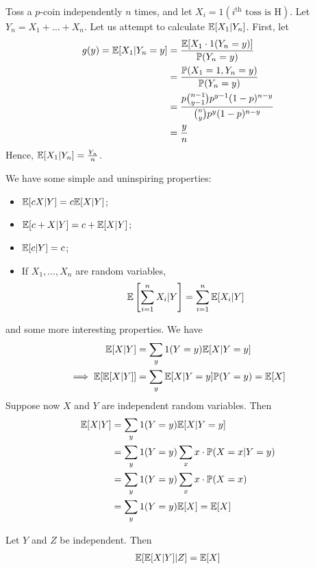 \documentclass{../template/note}
\begin{document}
    \begin{example*}
        Toss a \(p\)-coin independently \(n\) times, and let \(X_i = 1(i^\text{th} \text{ toss is H})\). Let \(Y_n = X_1 + \dots + X_n\). Let us attempt to calculate \(\mathbb E[X_1 | Y_n]\). First, let
        \begin{align*}
            g(y) = \mathbb E[X_1 | Y_n = y] &= \frac{\mathbb E[X_1 \cdot 1(Y_n=y)]}{\mathbb P(Y_n=y)} \\
            &= \frac{\mathbb P(X_1 = 1, Y_n = y)}{\mathbb P(Y_n=y)} \\
            &= \frac{p \binom{n-1}{y-1} p^{y-1} (1-p)^{n-y}}{\binom{n}{y} p^y (1-p)^{n-y}} \\
            &= \frac{y}{n}
        \end{align*}
        Hence, \(\mathbb E[X_1 | Y_n] = \frac{Y_n}{n}\).        
    \end{example*}
    We have some simple and uninspiring properties:
    \begin{itemize}
        \item \(\mathbb E[cX | Y] = c\mathbb E[X | Y]\);
        \item \(\mathbb E[c + X | Y] = c + \mathbb E[X | Y]\);
        \item \(\mathbb E[c | Y] = c\);
        \item If \(X_1, \dots, X_n\) are random variables,
        \begin{align*}
            \mathbb E\left[\sum_{i=1}^n X_i | Y\right] = \sum_{i=1}^n \mathbb E[X_i | Y]
        \end{align*}
    \end{itemize}
    and some more interesting properties. We have
    \begin{align*}
        \mathbb E[X | Y] &= \sum_y 1(Y = y) \mathbb E[X | Y = y] \\
        \implies \mathbb E[\mathbb E[X | Y]] &= \sum_y \mathbb E[X | Y = y]\mathbb P(Y = y)= \mathbb E[X]
    \end{align*}
    Suppose now \(X\) and \(Y\) are independent random variables. Then
    \begin{align*}
        \mathbb E[X | Y] &= \sum_y 1(Y = y) \mathbb E[X | Y = y] \\
        &= \sum_y 1(Y = y) \sum_x x \cdot \mathbb P(X = x | Y = y) \\
        &= \sum_y 1(Y = y) \sum_x x \cdot \mathbb P(X = x) \\
        &= \sum_y 1(Y = y) \mathbb E[X] = \mathbb E[X]
    \end{align*}
    
    \begin{proposition}
        Let \(Y\) and \(Z\) be independent. Then
        \begin{align*}
            \mathbb E[\mathbb E[X | Y] | Z] = \mathbb E[X]
        \end{align*}
    \end{proposition}
    
\end{document}

